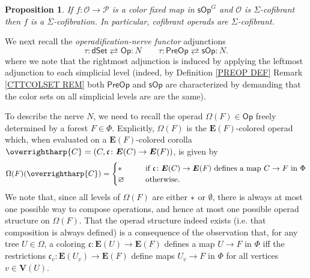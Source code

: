 \documentclass[a4paper,10pt]{article}%
\numberwithin{equation}{section}
\numberwithin{figure}{section}
\newtheorem{proposition}[equation]{Proposition}%
\theoremstyle{definition} %
\newcommand{\vect}[1]{\text{\overrightharp{\ensuremath{#1}}}}
\renewcommand{\O}{\ensuremath{\mathcal O}}
\newcommand{\1}{\ensuremath{\mathbbm 1}}%
\begin{document}
\begin{proposition}\label{COPOFSIGCOF PROP}
	If $f \colon \O \to \mathcal{P}$
	is a color fixed map in $\mathsf{sOp}^G$
	and $\O$ is $\Sigma$-cofibrant
	then $f$ is a $\Sigma$-cofibration.
	In particular, cofibrant operads are $\Sigma$-cofibrant.
\end{proposition}




We next recall the 
\emph{operadification-nerve functor}
adjunctions
\begin{equation}\label{TAUNER EQ}
	\tau\colon \mathsf{dSet}
	\rightleftarrows
	\mathsf{Op} \colon N
\qquad
	\tau\colon \mathsf{PreOp}
	\rightleftarrows
	\mathsf{sOp} \colon N.
\end{equation}
where we note that the rightmost adjunction 
is induced by applying the leftmost adjunction
to each simplicial level
(indeed, by Definition \ref{PREOP DEF} 
Remark \ref{CTTCOLSET REM}
both $\mathsf{PreOp}$ and $\mathsf{sOp}$
are characterized by demanding that
the color sets on all simplicial levels are
are the same).

To describe the nerve $N$, 
we need to recall the operad
$\Omega(F) \in \mathsf{Op}$
freely determined by a forest $F \in \Phi$.
Explicitly, 
$\Omega(F)$ is the $\boldsymbol{E}(F)$-colored operad
which, when evaluated on
a $\boldsymbol{E}(F)$-colored corolla
$\vect{C} = 
(C,\mathfrak{c} \colon \boldsymbol{E}(C) \to \boldsymbol{E}(F))$,
is given by
\begin{equation}\label{OMEGADEF_EQ}
\Omega(F)(\vect C) =
	\begin{cases}
		\** \qquad & 
		\mbox{if
			$\mathfrak{c} \colon \boldsymbol{E}(C) \to \boldsymbol{E}(F)$
			defines a map $C \to F$ in $\Phi$}
	\\
		\varnothing & \text{otherwise.}
	\end{cases}
\end{equation}
We note that, since all levels of 
$\Omega(F)$ are either $\**$ or $\emptyset$,
there is always at most one possible way to compose operations,
and hence at most one possible operad structure on $\Omega(F)$.
That the operad structure indeed exists 
(i.e. that composition is always defined)
is a consequence of the observation that,
for any tree $U\in \Omega$,
a coloring
$\mathfrak{c} \colon \boldsymbol{E}(U) \to \boldsymbol{E}(F)$
defines a map
$U \to F$ in $\Phi$
iff
the restrictions
$\mathfrak{c}_v \colon \boldsymbol{E}(U_v) \to \boldsymbol{E}(F)$
define maps
$U_v \to F$ in $\Phi$
for all vertices $v \in \boldsymbol{V}(U)$.
\end{document}
